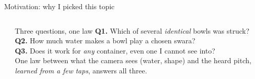 \begin{frame}{Motivation: why I picked this topic}
\begin{columns}[T]
\begin{itemize}
        \end{itemize}
        \begin{block}{Three questions, one law}
            \scriptsize
            \textbf{Q1.} Which of several \emph{identical} bowls was struck?\\
            \textbf{Q2.} How much water makes a bowl play a chosen swara?\\
            \textbf{Q3.} Does it work for \emph{any} container, even one I cannot see into?\\[2pt]
            One law between what the camera sees (water, shape) and the heard pitch,
            \emph{learned from a few taps}, answers all three.
        \end{block}
    \end{columns}
\end{frame}

